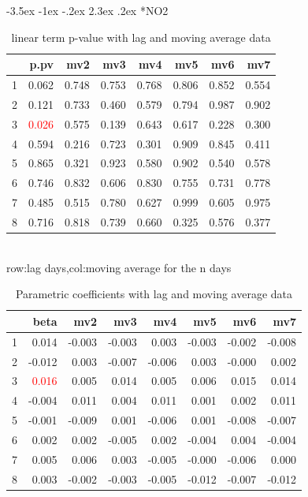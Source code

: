\documentclass[a4paper, 12pt]{article}
\makeatletter
\def\large{\fontsize{14}{20}\selectfont}
\renewcommand\subsection{\@startsection {subsection}{1}{\z@}%
                                   {-3.5ex \@plus -1ex \@minus -.2ex}%
                                   {2.3ex \@plus.2ex}%
                                   {\centering\normalfont\large\bfseries}}
\makeatother
\begin{document}
\subsection*{NO2}
\begin{table}[h]
\centering
\caption{linear term p-value with lag and moving average data}
\begin{tabular}{rrrrrrrr}
  \hline
 & p.pv & mv2 & mv3 & mv4 & mv5 & mv6 & mv7 \\
  \hline
1 & 0.062 & 0.748 & 0.753 & 0.768 & 0.806 & 0.852 & 0.554 \\
  2 & 0.121 & 0.733 & 0.460 & 0.579 & 0.794 & 0.987 & 0.902 \\
  3 & \textcolor{red}{0.026} & 0.575 & 0.139 & 0.643 & 0.617 & 0.228 & 0.300 \\
  4 & 0.594 & 0.216 & 0.723 & 0.301 & 0.909 & 0.845 & 0.411 \\
  5 & 0.865 & 0.321 & 0.923 & 0.580 & 0.902 & 0.540 & 0.578 \\
  6 & 0.746 & 0.832 & 0.606 & 0.830 & 0.755 & 0.731 & 0.778 \\
  7 & 0.485 & 0.515 & 0.780 & 0.627 & 0.999 & 0.605 & 0.975 \\
  8 & 0.716 & 0.818 & 0.739 & 0.660 & 0.325 & 0.576 & 0.377 \\
   \hline
\end{tabular}
\\row:lag days,col:moving average for the n days
\end{table}

\begin{table}[h]
\centering
\caption{Parametric coefficients with lag and moving average data}
\begin{tabular}{rrrrrrrr}
  \hline
 & beta & mv2 & mv3 & mv4 & mv5 & mv6 & mv7 \\
  \hline
1 & 0.014 & -0.003 & -0.003 & 0.003 & -0.003 & -0.002 & -0.008 \\
  2 & -0.012 & 0.003 & -0.007 & -0.006 & 0.003 & -0.000 & 0.002 \\
  3 & \textcolor{red}{0.016} & 0.005 & 0.014 & 0.005 & 0.006 & 0.015 & 0.014 \\
  4 & -0.004 & 0.011 & 0.004 & 0.011 & 0.001 & 0.002 & 0.011 \\
  5 & -0.001 & -0.009 & 0.001 & -0.006 & 0.001 & -0.008 & -0.007 \\
  6 & 0.002 & 0.002 & -0.005 & 0.002 & -0.004 & 0.004 & -0.004 \\
  7 & 0.005 & 0.006 & 0.003 & -0.005 & -0.000 & -0.006 & 0.000 \\
  8 & 0.003 & -0.002 & -0.003 & -0.005 & -0.012 & -0.007 & -0.012 \\
   \hline
\end{tabular}
\end{table}
\clearpage
\end{document}
